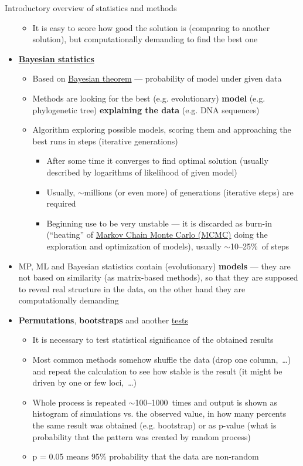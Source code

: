 \documentclass[compress, ucs, xelatex, 11pt, xcolor=svgnames, aspectratio=169,
	hyperref={
		bookmarks=true,
		unicode=true,
		colorlinks=true,
		pdftitle={Molecular data in R},
		plainpages=false,
		pdfauthor={Vojtech Zeisek},
		pdfsubject={Course about phylogeny and evolution in R},
		pdfcreator={XeLaTeX},
		pdfkeywords={R, evolution, phylogeny, molecular data},
		linkcolor=Crimson, %
		anchorcolor=Magenta, %
		citecolor=Magenta, %
		filecolor=Magenta, %
		menucolor=Magenta, %
		urlcolor=DodgerBlue, %
		pdftex},
	url={hyphens, lowtilde} %
	]{beamer}
\begin{document}
\begin{frame}[allowframebreaks]{Introductory overview of statistics and methods}
\begin{itemize}
\begin{itemize}
			\item It is easy to score how good the solution is (comparing to another solution), but computationally demanding to find the best one
		\end{itemize}
		\item \textbf{\href{https://en.wikipedia.org/wiki/Bayesian_statistics}{Bayesian statistics}}
		\begin{itemize}
			\item Based on \href{https://en.wikipedia.org/wiki/Bayes_theorem}{Bayesian theorem} --- probability of model under given data
			\item Methods are looking for the best (e.g. evolutionary) \textbf{model} (e.g. phylogenetic tree) \textbf{explaining the data} (e.g. DNA sequences)
			\item Algorithm exploring possible models, scoring them and approaching the best runs in steps (iterative generations)
			\begin{itemize}
				\item After some time it converges to find optimal solution (usually described by logarithms of likelihood of given model)
				\item Usually, $\sim$millions (or even more) of generations (iterative steps) are required
				\item Beginning use to be very unstable --- it is discarded as burn-in (\enquote{heating} of \href{https://en.wikipedia.org/wiki/Markov_chain_Monte_Carlo}{Markov Chain Monte Carlo (MCMC)} doing the exploration and optimization of models), usually $\sim$10--25\%~of steps
			\end{itemize}
		\end{itemize}
		\item MP, ML and Bayesian statistics contain (evolutionary) \textbf{models} --- they are not based on similarity (as matrix-based methods), so that they are supposed to reveal real structure in the data, on the other hand they are computationally demanding
		\item \textbf{Permutations}, \textbf{bootstraps} and another \href{https://en.wikipedia.org/wiki/Resampling_(statistics)}{tests}
		\begin{itemize}
			\item It is necessary to test statistical significance of the obtained results
			\item Most common methods somehow shuffle the data (drop one column,~\ldots) and repeat the calculation to see how stable is the result (it might be driven by one or few loci,~\ldots)
			\item Whole process is repeated $\sim$100--1000~times and output is shown as histogram of simulations vs. the observed value, in how many percents the same result was obtained (e.g. bootstrap) or as p-value (what is probability that the pattern was created by random process)
			\item p = 0.05 means 95\% probability that the data are non-random
		\end{itemize}
	\end{itemize}
\end{frame}
\end{document}
